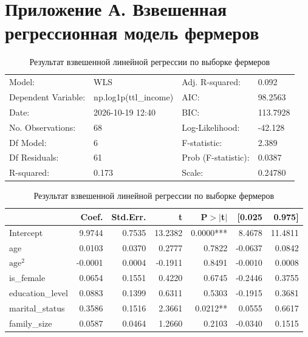 \documentclass[14pt, a4paper]{article}
\begin{document}
	\section*{Приложение А. Взвешенная регрессионная модель фермеров}
		\begin{table}[H]
			\caption{Результат взвешенной линейной регрессии по выборке фермеров}
			\label{tab:ols_farmers}
			\begin{center}
				\begin{tabular}{llll}
					\hline
					Model:              & WLS                   & Adj. R-squared:     & 0.092     \\
					Dependent Variable: & np.log1p(ttl\_income) & AIC:                & 98.2563   \\
					Date:               & 2026-10-19 12:40      & BIC:                & 113.7928  \\
					No. Observations:   & 68                    & Log-Likelihood:     & -42.128   \\
					Df Model:           & 6                     & F-statistic:        & 2.389     \\
					Df Residuals:       & 61                    & Prob (F-statistic): & 0.0387    \\
					R-squared:          & 0.173                 & Scale:              & 0.24780   \\
					\hline
				\end{tabular}
			\end{center}
			
			\begin{center}
				\begin{tabular}{lrrrrrr}
					\hline
					&   Coef. & Std.Err. &       t & P$> |$t$|$ &  [0.025 &  0.975]  \\
					\hline
					Intercept        &  9.9744 &   0.7535 & 13.2382 &      0.0000*** &  8.4678 & 11.4811  \\
					age              &  0.0103 &   0.0370 &  0.2777 &      0.7822 & -0.0637 &  0.0842  \\
					$\mathrm{age}^{2}$      & -0.0001 &   0.0004 & -0.1911 &      0.8491 & -0.0010 &  0.0008  \\
					is\_female       &  0.0654 &   0.1551 &  0.4220 &      0.6745 & -0.2446 &  0.3755  \\
					education\_level &  0.0883 &   0.1399 &  0.6311 &      0.5303 & -0.1915 &  0.3681  \\
					marital\_status  &  0.3586 &   0.1516 &  2.3661 &      0.0212** &  0.0555 &  0.6617  \\
					family\_size     &  0.0587 &   0.0464 &  1.2660 &      0.2103 & -0.0340 &  0.1515  \\
					\hline
				\end{tabular}
			\end{center}
			

\end{table}
\end{document}
